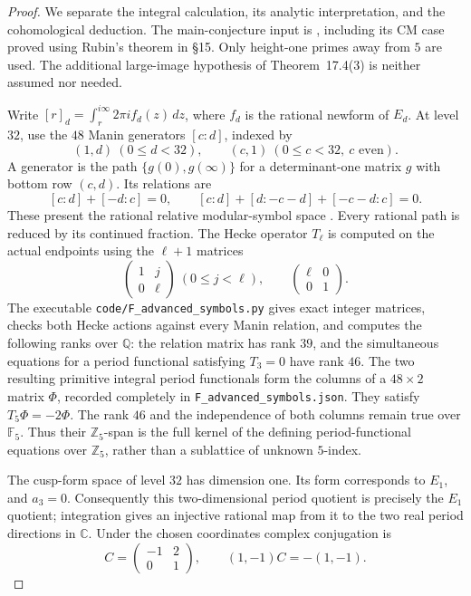 \begin{proof}
We separate the integral calculation, its analytic interpretation,
and the cohomological deduction. The main-conjecture input is
\citet[Theorem~17.4(1)--(2)]{FA_Kato2004}, including its CM case
proved using Rubin's theorem in \S15. Only height-one primes away
from $5$ are used. The additional large-image hypothesis of
Theorem~17.4(3) is neither assumed nor needed.

Write $[r]_d=\int_r^{i\infty}2\pi i f_d(z)\,dz$, where $f_d$
is the rational newform of $E_d$. At level $32$, use the $48$
Manin generators $[c:d]$, indexed by
\[
 (1,d)\ (0\le d<32),\qquad (c,1)\ (0\le c<32,\ c\text{ even}).
\]
A generator is the path $\{g(0),g(\infty)\}$ for a determinant-one
matrix $g$ with bottom row $(c,d)$. Its relations are
\[
 [c:d]+[-d:c]=0,\qquad
 [c:d]+[d:-c-d]+[-c-d:c]=0.
\]
These present the rational relative modular-symbol space
\citep[Chapter~3, Manin-symbol presentation]{FA_Stein2007}.
Every rational path is reduced by its continued fraction. The
Hecke operator $T_\ell$ is computed on the actual endpoints using
the $\ell+1$ matrices
\[
 \begin{pmatrix}1&j\\0&\ell\end{pmatrix}\ (0\le j<\ell),
 \qquad \begin{pmatrix}\ell&0\\0&1\end{pmatrix}.
\]
The executable \texttt{code/F\_advanced\_symbols.py} gives exact
integer matrices, checks both Hecke actions against every Manin
relation, and computes the following ranks over $\mathbb Q$:
the relation matrix has rank $39$, and the simultaneous equations
for a period functional satisfying $T_3=0$ have rank $46$.
The two resulting primitive integral period functionals form the
columns of a $48\times2$ matrix $\Phi$, recorded completely in
\texttt{F\_advanced\_symbols.json}. They satisfy $T_5\Phi=-2\Phi$.
The rank $46$ and the independence of both columns remain true
over $\mathbb F_5$. Thus their $\mathbb Z_5$-span is the full
kernel of the defining period-functional equations over
$\mathbb Z_5$, rather than a sublattice of unknown $5$-index.

The cusp-form space of level $32$ has dimension one. Its form
corresponds to $E_1$, and $a_3=0$. Consequently this two-dimensional
period quotient is precisely the $E_1$ quotient; integration gives
an injective rational map from it to the two real period directions
in $\mathbb C$. Under the chosen coordinates complex conjugation is
\[
 C=\begin{pmatrix}-1&2\\0&1\end{pmatrix},
 \qquad (1,-1)C=-(1,-1).
\]


\end{proof}
